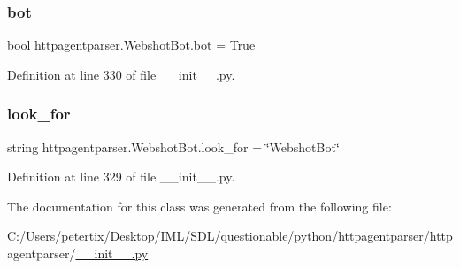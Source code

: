 \subsubsection{\texorpdfstring{bot}{bot}}
{\footnotesize\ttfamily bool httpagentparser.\+Webshot\+Bot.\+bot = True\hspace{0.3cm}{\ttfamily [static]}}



Definition at line 330 of file \+\_\+\+\_\+init\+\_\+\+\_\+.\+py.

\hypertarget{classhttpagentparser_1_1_webshot_bot_a017ef0f181bb36ff218ac52e3788b8d7}{}\label{classhttpagentparser_1_1_webshot_bot_a017ef0f181bb36ff218ac52e3788b8d7} 
\subsubsection{\texorpdfstring{look\+\_\+for}{look\_for}}
{\footnotesize\ttfamily string httpagentparser.\+Webshot\+Bot.\+look\+\_\+for = \char`\"{}Webshot\+Bot\char`\"{}\hspace{0.3cm}{\ttfamily [static]}}



Definition at line 329 of file \+\_\+\+\_\+init\+\_\+\+\_\+.\+py.



The documentation for this class was generated from the following file\+:\begin{DoxyCompactItemize}
\item 
C\+:/\+Users/petertix/\+Desktop/\+I\+M\+L/\+S\+D\+L/questionable/python/httpagentparser/httpagentparser/\hyperlink{____init_____8py}{\+\_\+\+\_\+init\+\_\+\+\_\+.\+py}\end{DoxyCompactItemize}
